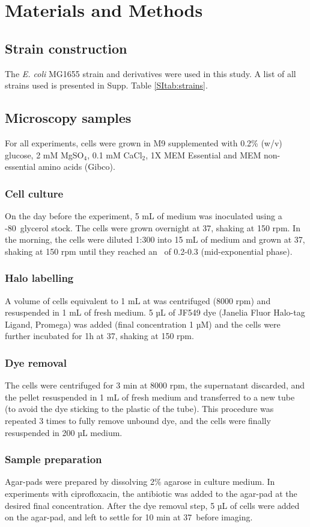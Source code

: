 \section*{Materials and Methods}

\subsection*{Strain construction}
The \textit{E. coli} MG1655 strain and derivatives were used in this study. A list of all strains used is presented in Supp. Table \ref{SItab:strains}.

\subsection*{Microscopy samples}
For all experiments, cells were grown in M9 supplemented with 0.2\% (w/v) glucose, 2 mM MgSO$_4$, 0.1 mM CaCl$_2$, 1X MEM Essential and MEM non-essential amino acids (Gibco).
\subsubsection*{Cell culture}
On the day before the experiment, 5 mL of medium was inoculated using a -80\celsius\ glycerol stock. The cells were grown overnight at 37\celsius, shaking at 150 rpm. In the morning, the cells were diluted 1:300 into 15 mL of medium and grown at 37\celsius, shaking at 150 rpm until they reached an \od\ of 0.2-0.3 (mid-exponential phase).
\subsubsection*{Halo labelling}
A volume of cells equivalent to 1 mL at  was centrifuged (8000 rpm) and resuspended in 1 mL of fresh medium. 5 µL of JF549 dye (Janelia Fluor Halo-tag Ligand, Promega) was added (final concentration 1 µM) and the cells were further incubated for 1h at 37\celsius, shaking at 150 rpm.
\subsubsection*{Dye removal}
The cells were centrifuged for 3 min at 8000 rpm, the supernatant discarded, and the pellet resuspended in 1 mL of fresh medium and transferred to a new tube (to avoid the dye sticking to the plastic of the tube). This procedure was repeated 3 times to fully remove unbound dye, and the cells were finally resuspended in 200 µL medium.
\subsubsection*{Sample preparation}
Agar-pads were prepared by dissolving 2\% agarose in culture medium. In experiments with ciprofloxacin, the antibiotic was added to the agar-pad at the desired final concentration. After the dye removal step, 5 µL of cells were added on the agar-pad, and left to settle for 10 min at 37\celsius\ before imaging.


